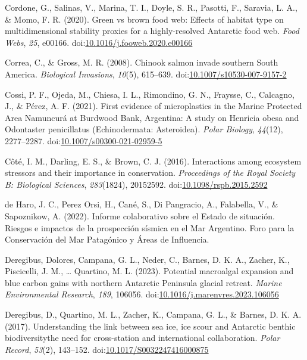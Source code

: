 \documentclass[
]{article}
\newlength{\cslhangindent}
\newlength{\cslentryspacingunit} %
\newenvironment{CSLReferences}[2] %
 {%
  \setlength{\parindent}{0pt}
  \ifodd #1
  \let\oldpar\par
  \def\par{\hangindent=\cslhangindent\oldpar}
  \fi
  \setlength{\parskip}{#2\cslentryspacingunit}
 }%
 {}
\begin{document}
\begin{CSLReferences}{1}{0}
\leavevmode{}%
Cordone, G., Salinas, V., Marina, T. I., Doyle, S. R., Pasotti, F.,
Saravia, L. A., \& Momo, F. R. (2020). Green vs brown food web:
{Effects} of habitat type on multidimensional stability proxies for a
highly-resolved {Antarctic} food web. \emph{Food Webs}, \emph{25},
e00166.
doi:\href{https://doi.org/10.1016/j.fooweb.2020.e00166}{10.1016/j.fooweb.2020.e00166}

\leavevmode{}%
Correa, C., \& Gross, M. R. (2008). Chinook salmon invade southern
{South America}. \emph{Biological Invasions}, \emph{10}(5), 615--639.
doi:\href{https://doi.org/10.1007/s10530-007-9157-2}{10.1007/s10530-007-9157-2}

\leavevmode{}%
Cossi, P. F., Ojeda, M., Chiesa, I. L., Rimondino, G. N., Fraysse, C.,
Calcagno, J., \& Pérez, A. F. (2021). First evidence of microplastics in
the {Marine Protected Area Namuncurá} at {Burdwood Bank}, {Argentina}: A
study on {Henricia} obesa and {Odontaster} penicillatus
({Echinodermata}: {Asteroidea}). \emph{Polar Biology}, \emph{44}(12),
2277--2287.
doi:\href{https://doi.org/10.1007/s00300-021-02959-5}{10.1007/s00300-021-02959-5}

\leavevmode{}%
Côté, I. M., Darling, E. S., \& Brown, C. J. (2016). Interactions among
ecosystem stressors and their importance in conservation.
\emph{Proceedings of the Royal Society B: Biological Sciences},
\emph{283}(1824), 20152592.
doi:\href{https://doi.org/10.1098/rspb.2015.2592}{10.1098/rspb.2015.2592}

\leavevmode{}%
de Haro, J. C., Perez Orsi, H., Cané, S., Di Pangracio, A., Falabella,
V., \& Sapoznikow, A. (2022). {Informe colaborativo sobre el Estado de
situación. Riesgos e impactos de la prospección sísmica en el Mar
Argentino}. {Foro para la Conservación del Mar Patagónico y Áreas de
Influencia}.

\leavevmode{}%
Deregibus, Dolores, Campana, G. L., Neder, C., Barnes, D. K. A., Zacher,
K., Piscicelli, J. M., \ldots{} Quartino, M. L. (2023). Potential
macroalgal expansion and blue carbon gains with northern {Antarctic
Peninsula} glacial retreat. \emph{Marine Environmental Research},
\emph{189}, 106056.
doi:\href{https://doi.org/10.1016/j.marenvres.2023.106056}{10.1016/j.marenvres.2023.106056}

\leavevmode{}%
Deregibus, D., Quartino, M. L., Zacher, K., Campana, G. L., \& Barnes,
D. K. A. (2017). Understanding the link between sea ice, ice scour and
{Antarctic} benthic biodiversity\textendash the need for cross-station
and international collaboration. \emph{Polar Record}, \emph{53}(2),
143--152.
doi:\href{https://doi.org/10.1017/S0032247416000875}{10.1017/S0032247416000875}


\end{CSLReferences}
\end{document}
